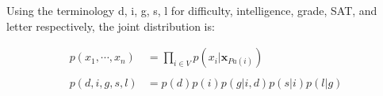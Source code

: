 \documentclass{article}
\begin{document}
Using the terminology d, i, g, s, l for difficulty, intelligence, grade, SAT, and letter respectively, the joint distribution is:

\begin{align}
    p(x_{1}, \cdots , x_{n}) &= \prod_{i \in V} p(x_{i} | \boldsymbol{x}_{Pa(i)}) \\
    \\
    p(d,i,g,s,l) &= p(d)p(i)p(g | i,d)p(s | i)p(l | g)
\end{align}
\end{document}
